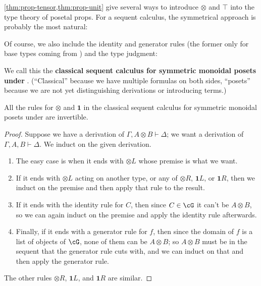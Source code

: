 \documentclass{book}
\let\types\vdash
\def\type{\;\ftype}
\def\unit{\top}%
\def\one{\mathbf{1}}
\let\tensor\otimes
\def\tensorL{\mathord{\tensor}L}
\def\tensorR{\mathord{\tensor}R}
\begin{document}
\cref{thm:prop-tensor,thm:prop-unit} give several ways to introduce $\tensor$ and $\unit$ into the type theory of posetal props.
For a sequent calculus, the symmetrical approach is probably the most natural:
Of course, we also include the identity and generator rules (the former only for base types coming from \cG) and the type judgment:
We call this the \textbf{classical sequent calculus for symmetric monoidal posets under \cG}.
(``Classical'' because we have multiple formulas on both sides, ``posets'' because we are not yet distinguishing derivations or introducing terms.)

\begin{thm}\label{thm:seqcalc-smpos-invertible}
  All the rules for $\tensor$ and $\one$ in the classical sequent calculus for symmetric monoidal posets under \cG are invertible.
\end{thm}
\begin{proof}
  Suppose we have a derivation of $\Gamma,A\tensor B\types \Delta$; we want a derivation of $\Gamma,A,B\types \Delta$.
  We induct on the given derivation.
  \begin{enumerate}
  \item The easy case is when it ends with $\tensorL$ whose premise is what we want.
  \item If it ends with $\tensorL$ acting on another type, or any of $\tensorR$, $\one L$, or $\one R$, then we induct on the premise and then apply that rule to the result.
  \item If it ends with the identity rule for $C$, then since $C\in \cG$ it can't be $A\tensor B$, so we can again induct on the premise and apply the identity rule afterwards.
  \item Finally, if it ends with a generator rule for $f$, then since the domain of $f$ is a list of objects of $\cG$, none of them can be $A\tensor B$; so $A\tensor B$ must be in the sequent that the generator rule cuts with, and we can induct on that and then apply the generator rule.
  \end{enumerate}
  The other rules $\tensorR$, $\one L$, and $\one R$ are similar.
\end{proof}
\end{document}
